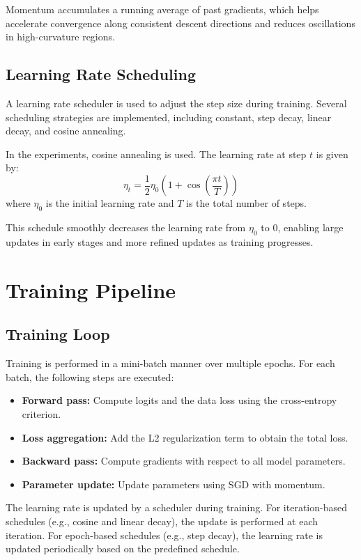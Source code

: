 \documentclass[11pt]{article}
\begin{document}
Momentum accumulates a running average of past gradients, which helps accelerate convergence along consistent descent directions and reduces oscillations in high-curvature regions.

\subsection{Learning Rate Scheduling}

A learning rate scheduler is used to adjust the step size during training. Several scheduling strategies are implemented, including constant, step decay, linear decay, and cosine annealing.

In the experiments, cosine annealing is used. The learning rate at step $t$ is given by:
\[
\eta_t = \frac{1}{2} \eta_0 \left(1 + \cos\left(\frac{\pi t}{T}\right)\right)
\]
where $\eta_0$ is the initial learning rate and $T$ is the total number of steps.

This schedule smoothly decreases the learning rate from $\eta_0$ to $0$, enabling large updates in early stages and more refined updates as training progresses.

\section{Training Pipeline}

\subsection{Training Loop}

Training is performed in a mini-batch manner over multiple epochs. For each batch, the following steps are executed:

\begin{itemize}
    \item \textbf{Forward pass:} Compute logits and the data loss using the cross-entropy criterion.
    \item \textbf{Loss aggregation:} Add the L2 regularization term to obtain the total loss.
    \item \textbf{Backward pass:} Compute gradients with respect to all model parameters.
    \item \textbf{Parameter update:} Update parameters using SGD with momentum.
\end{itemize}

The learning rate is updated by a scheduler during training. For iteration-based schedules (e.g., cosine and linear decay), the update is performed at each iteration. For epoch-based schedules (e.g., step decay), the learning rate is updated periodically based on the predefined schedule.
\end{document}
